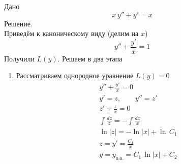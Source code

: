 \begin{Example}
    Дано
    \[
        x\,y'' + y' = x
    \]
    Решение.\\
    Приведём к каноническому виду (делим на $x$)
    \[
        y'' + \frac{y'}{x} = 1
    \]
    Получили $L(y)$. Решаем в два этапа
    \begin{enumerate}
        \item Рассматриваем однородное уравнение $L(y) = 0$
        \begin{gather*}
            y'' + \frac{y'}{x} = 0\\
            y' = z, \qquad y'' = z'\\
            z' + \frac{z}{x} = 0\\
            \int \frac{dz}{z} = - \int \frac{dx}{x}\\
            \ln|z| = - \ln|x| + \ln\,C_1\\
            z = y' = \frac{C_1}{x}\\
            y = y_{\text{о.о.}} = C_1\, \ln|x| + C_2
        \end{gather*}
        

\end{enumerate}
\end{Example}
